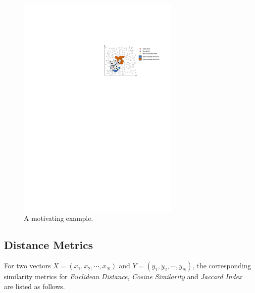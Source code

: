 \begin{figure}
\centering
\includegraphics[width=0.7\textwidth]{figures/motivate-example.pdf} 
\caption{A motivating example.}\label{motivate-example}
\end{figure}

\subsection{Distance Metrics}
For two vectors $\mathit{X} = (x_1, x_2, \cdots, x_N)$ and $\mathit{Y} = (y_1, y_2, \cdots, y_N)$, the corresponding similarity metrics for \textit{Euclidean Distance}, \textit{Cosine Similarity} and \textit{Jaccard Index} are listed as follows.

